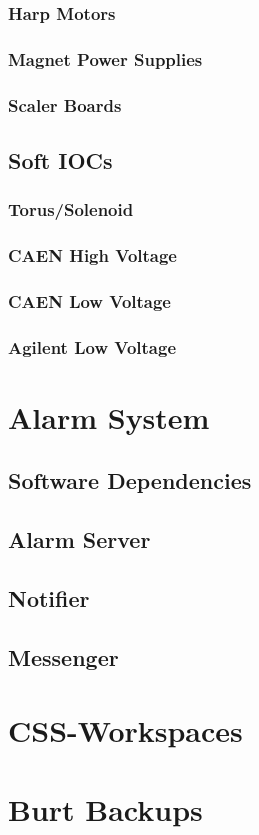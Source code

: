 \documentclass[amsmath,amssymb,notitlepage,11pt]{revtex4}
\begin{document}
\subsubsection{Harp Motors}
\subsubsection{Magnet Power Supplies}
\subsubsection{Scaler Boards}
\subsection{Soft IOCs}
\subsubsection{Torus/Solenoid}
\subsubsection{CAEN High Voltage}
\subsubsection{CAEN Low Voltage}
\subsubsection{Agilent Low Voltage}


\section{Alarm System}
\subsection{Software Dependencies}
\subsection{Alarm Server}
\subsection{Notifier}
\subsection{Messenger}

\section{CSS-Workspaces}

\section{Burt Backups}


%
\end{document}
